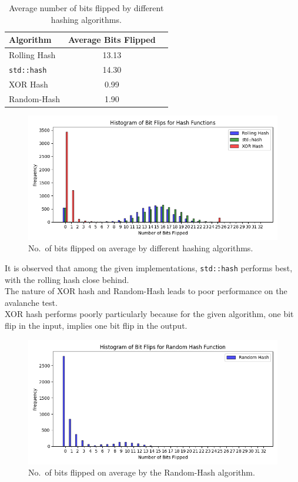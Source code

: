 \documentclass[12pt]{article}
\begin{document}
\begin{table}[H]
  \centering
  \begin{tabular}{@{}lcc@{}}
    \toprule
    \textbf{Algorithm}   & \textbf{Average Bits Flipped} \\ \midrule
    Rolling Hash         & 13.13                         \\
    \texttt{std::hash}   & 14.30                         \\
    XOR Hash             & 0.99                          \\
    Random-Hash          & 1.90                          \\ \bottomrule
  \end{tabular}
  \caption{Average number of bits flipped by different hashing algorithms.}
\end{table}

\begin{figure}[H]
  \centering
  \includegraphics[width=0.7\linewidth]{grouped-histogram.png}
  \caption{No.\ of bits flipped on average by different hashing algorithms.}
\end{figure}

It is observed that among the given implementations, \texttt{std::hash} performs best, with the rolling hash close behind. \\
The nature of XOR hash and Random-Hash leads to poor performance on the avalanche test. \\
XOR hash performs poorly particularly because for the given algorithm, one bit flip in the input, implies one bit flip in the output.  

\begin{figure}[H]
  \centering
  \includegraphics[width=0.7\linewidth]{random-hash-histogram.png}
  \caption{No.\ of bits flipped on average by the Random-Hash algorithm.}
\end{figure}
\end{document}
